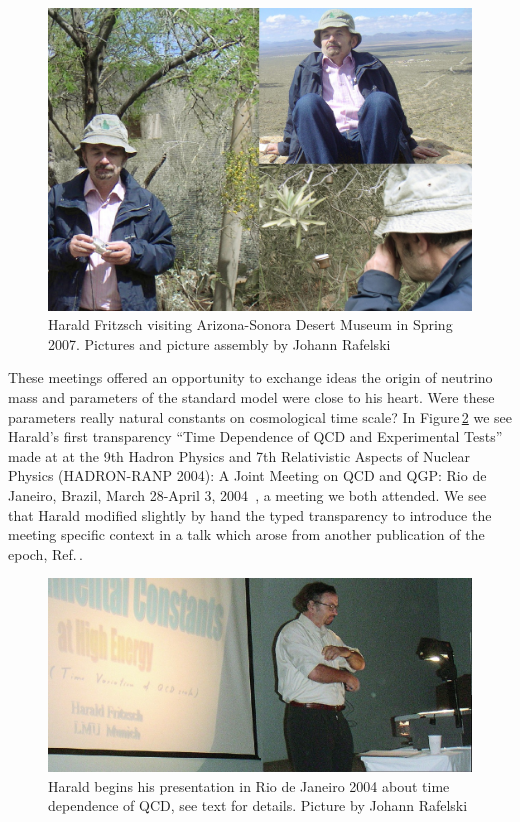 \documentclass[addchapnum]{ws-rv961x669} %
\begin{document}
\begin{figure}%
\centerline{\includegraphics[width=0.95\columnwidth]{07March24HaraldCollageDesertMuseum.jpg}}
\caption{Harald Fritzsch visiting Arizona-Sonora Desert Museum in Spring 2007. Pictures and picture assembly by Johann Rafelski
}
\label{Fig:AZcolloq2007} 
\end{figure}

These meetings offered an opportunity to exchange ideas the  origin of neutrino mass and parameters of  the standard model were close to his heart. Were these parameters really natural constants on cosmological time scale? In Figure\,\ref{Fig:RANP2004} we see Harald's first transparency ``Time Dependence of QCD and Experimental Tests'' made at at the 9th Hadron Physics and 7th Relativistic Aspects of Nuclear Physics (HADRON-RANP 2004): A Joint Meeting on QCD and QGP: Rio de Janeiro, Brazil, March 28-April 3, 2004~\cite{Fritzsch:2004civ}, a meeting we both attended. We see that Harald modified slightly by hand the typed transparency to introduce the meeting specific context in a talk which arose from another publication of the epoch, Ref.\,\cite{Calmet:2001nu}. 

\begin{figure}%
\centerline{\includegraphics[width=0.95\columnwidth]{04RANPHarald1Ed.jpg}}
\caption{Harald begins his presentation in Rio de Janeiro 2004 about time dependence of QCD, see text for details. Picture by Johann Rafelski
}
\label{Fig:RANP2004} 
\end{figure}
 




\end{document}
